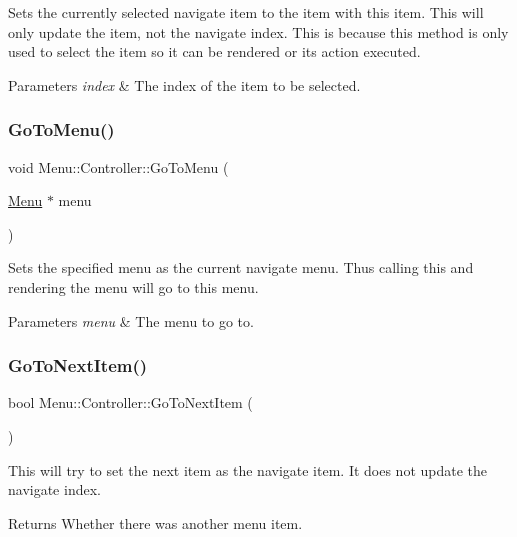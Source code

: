 Sets the currently selected navigate item to the item with this item. This will only update the item, not the navigate index. This is because this method is only used to select the item so it can be rendered or its action executed. 
\begin{DoxyParams}{Parameters}
{\em index} & The index of the item to be selected. \\
\hline
\end{DoxyParams}
\hypertarget{class_menu_1_1_controller_a1df8e49520c77372d479903c3ec93341}{}\label{class_menu_1_1_controller_a1df8e49520c77372d479903c3ec93341} 
\subsubsection{\texorpdfstring{Go\+To\+Menu()}{GoToMenu()}}
{\footnotesize\ttfamily void Menu\+::\+Controller\+::\+Go\+To\+Menu (\begin{DoxyParamCaption}\item[{\hyperlink{struct_menu_1_1_menu}{Menu} $\ast$}]{menu }\end{DoxyParamCaption})}

Sets the specified menu as the current navigate menu. Thus calling this and rendering the menu will go to this menu. 
\begin{DoxyParams}{Parameters}
{\em menu} & The menu to go to. \\
\hline
\end{DoxyParams}
\hypertarget{class_menu_1_1_controller_ad93989bb6a9ed55f67ad5c15e666cf39}{}\label{class_menu_1_1_controller_ad93989bb6a9ed55f67ad5c15e666cf39} 
\subsubsection{\texorpdfstring{Go\+To\+Next\+Item()}{GoToNextItem()}}
{\footnotesize\ttfamily bool Menu\+::\+Controller\+::\+Go\+To\+Next\+Item (\begin{DoxyParamCaption}{ }\end{DoxyParamCaption})\hspace{0.3cm}{\ttfamily [private]}}

This will try to set the next item as the navigate item. It does not update the navigate index. \begin{DoxyReturn}{Returns}
Whether there was another menu item. 
\end{DoxyReturn}
\hypertarget{class_menu_1_1_controller_ab30a038c4e4e3cb102d419c11a6813f6}{}\label{class_menu_1_1_controller_ab30a038c4e4e3cb102d419c11a6813f6} 
